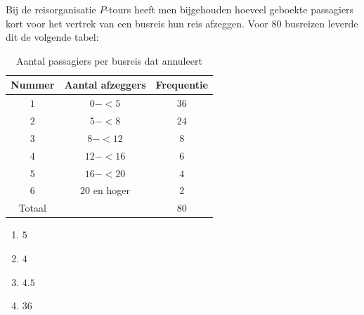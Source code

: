 Bij de reisorganisatie $P$-tours heeft men bijgehouden hoeveel geboekte passagiers kort voor het vertrek van een busreis hun reis afzeggen.
Voor $80$ busreizen leverde dit de volgende tabel:

\begin{table}[htbp!]
    \centering
    \caption{Aantal passagiers per busreis dat annuleert}
    \begin{tabular}{ccc}
        \toprule
            {\bfseries Nummer} & {\bfseries Aantal afzeggers} & {\bfseries Frequentie} \\
        \midrule
            $1$ & $0 -< 5$ & $36$ \\
            $2$ & $5 -< 8$ & $24$ \\
            $3$ & $8 -< 12$ & $8$ \\
            $4$ & $12 -< 16$ & $6$ \\
            $5$ & $16 -< 20$ & $4$ \\
            $6$ & $20$ en hoger & $2$ \\
        \midrule    
            Totaal & & $80$ \\
        \bottomrule
    \end{tabular}
\end{table}

\begin{enumerate}[label=(\alph*)]
    \item $5$
    \item $4$
    \item $4.5$
    \item $36$
\end{enumerate}
